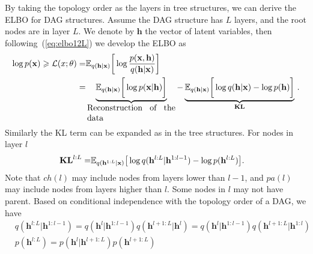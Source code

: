 \documentclass[twoside]{article}
\begin{document}
By taking the topology order as the layers in tree structures, we can derive the ELBO for DAG structures.  
Assume the DAG structure has $L$ layers, and the root nodes are in layer $L$. 
We denote by $\mathbf{h}$ the vector of latent variables, then following~(\ref{eq:elbo12L}) we develop the ELBO as
\begin{align}  \label{eq:dag_elbo}
\log p(\mathbf{x})  \geqslant  \mathcal{L}(x;\theta)  = &  \mathbb{E}_{q(\mathbf{h} | \mathbf{x})} \bigg[ \log  \frac{p(\mathbf{x}, \mathbf{h})}{q(\mathbf{h}|\mathbf{x})}  \bigg]  \\ \notag
=&  \underbrace{ \mathbb{E}_{q(\mathbf{h} | \mathbf{x})} \bigg[ \log  p(\mathbf{x} |\mathbf{h})  \bigg] }_{  \parbox{10.5em}{Reconstruction of the data}}  -  \underbrace{  \mathbb{E}_{q(\mathbf{h}| \mathbf{x})} \bigg[  \log q(\mathbf{h}|\mathbf{x}) - \log p( \mathbf{h}) \bigg] }_{\textbf{\text{KL}}} \, .   \notag
\end{align} %
Similarly the KL term can be expanded as in the tree structures. 
For nodes in layer $l$
\begin{align*} 
\textbf{\text{KL}}^{l:L} 
= &\mathbb{E}_{q(\mathbf{h}^{1:L}|\mathbf{x})}\big[  \log q(\mathbf{h}^{l:L}|\mathbf{h}^{1:l-1})- \log p(\mathbf{h}^{l:L})  \big].
\end{align*} 
Note that $ch(l)$ may include nodes from layers lower than $l-1$, and $pa(l)$ may include nodes from layers higher than $l$.
Some nodes in $l$ may not have parent. Based on conditional independence with the topology order of a DAG, we have 
\begin{align} \label{eq:dag_chain_q}
&q(\mathbf{h}^{l:L}|\mathbf{h}^{1:l-1})=q(\mathbf{h}^{l}|\mathbf{h}^{1:l-1})q(\mathbf{h}^{l+1:L}|\mathbf{h}^{l})=q(\mathbf{h}^{l}|\mathbf{h}^{1:l-1})q(\mathbf{h}^{l+1:L}|\mathbf{h}^{1:l})\\ \label{eq:dag_chain_p}
&p(\mathbf{h}^{l:L}) =p(\mathbf{h}^{l}|\mathbf{h}^{l+1:L})p(\mathbf{h}^{l+1:L})%
\end{align}
\end{document}
